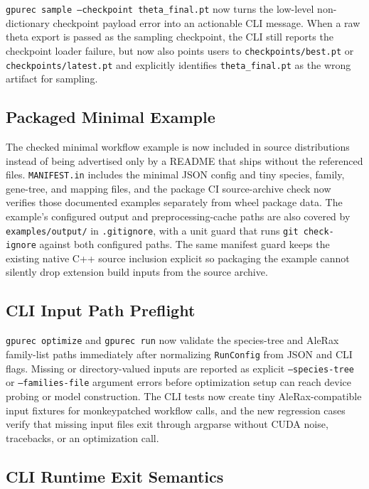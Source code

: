 \documentclass[11pt]{article}
\begin{document}
\texttt{gpurec sample --checkpoint theta\_final.pt} now turns the low-level
non-dictionary checkpoint payload error into an actionable CLI message.  When a
raw theta export is passed as the sampling checkpoint, the CLI still reports the
checkpoint loader failure, but now also points users to
\texttt{checkpoints/best.pt} or \texttt{checkpoints/latest.pt} and explicitly
identifies \texttt{theta\_final.pt} as the wrong artifact for sampling.

\subsection{Packaged Minimal Example}

The checked minimal workflow example is now included in source distributions
instead of being advertised only by a README that ships without the referenced
files.  \texttt{MANIFEST.in} includes the minimal JSON config and tiny species,
family, gene-tree, and mapping files, and the package CI source-archive check
now verifies those documented examples separately from wheel package data.  The
example's configured output and preprocessing-cache paths are also covered by
\texttt{examples/output/} in \texttt{.gitignore}, with a unit guard that runs
\texttt{git check-ignore} against both configured paths.  The same manifest
guard keeps the existing native C++ source inclusion explicit so packaging the
example cannot silently drop extension build inputs from the source archive.

\subsection{CLI Input Path Preflight}

\texttt{gpurec optimize} and \texttt{gpurec run} now validate the species-tree
and AleRax family-list paths immediately after normalizing \texttt{RunConfig}
from JSON and CLI flags.  Missing or directory-valued inputs are reported as
explicit \texttt{--species-tree} or \texttt{--families-file} argument errors
before optimization setup can reach device probing or model construction.  The
CLI tests now create tiny AleRax-compatible input fixtures for monkeypatched
workflow calls, and the new regression cases verify that missing input files
exit through argparse without CUDA noise, tracebacks, or an optimization call.

\subsection{CLI Runtime Exit Semantics}
\end{document}
